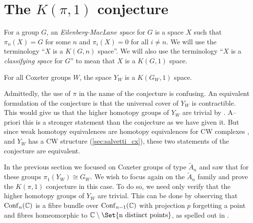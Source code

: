\documentclass[class=article, crop=false]{standalone}
\begin{document}
	
\section{The \texorpdfstring{$K(\pi,1)$}{K pi 1} conjecture}
For a group $G$, an \emph{Eilenberg-MacLane space} \cite{eilenberg_maclane_relations_1945} for $G$ is a space $X$ such that $\pi_n(X)=G$ for some $n$ and $\pi_i(X) = 0$ for all $i\neq n$. We will use the terminology ``$X$ is a $K(G,n)$ space''. We will also use the terminology ``$X$ is a \emph{classifying space} for $G$'' to mean that $X$ is a $K(G,1)$ space.
\begin{conjecture}[$K(\pi,1)$ Conjecture]
	For all Coxeter groups $W$, the space $Y_W$ is a $K(G_W,1)$ space.
\end{conjecture}

Admittedly, the use of $\pi$ in the name of the conjecture is confusing. An equivalent formulation of the conjecture is that the universal cover of $Y_W$ is contractible. This would give us that the higher homotopy groups of $Y_W$ are trivial by \cite[Porposition 4.1]{hatcher_algebraic_2001}. A--priori this is a stronger statement than the conjecture as we have given it. But since weak homotopy equivalences are homotopy equivalences for CW complexes \cite[Theorem 4.5]{hatcher_algebraic_2001}, and $Y_W$ has a CW structure (\cref{sec:salvetti_cx}), these two statements of the conjecture are equivalent.

In the previous section we focused on Coxeter groups of type $\tilde{A}_n$ and saw that for these groups $\pi_1(Y_W) \cong G_W$. We wish to focus again on the $\tilde{A}_n$ family and prove the $K(\pi, 1)$ conjecture in this case. To do so, we need only verify that the higher homotopy groups of $Y_W$ are trivial. This can be done by observing that $\operatorname{Conf}_n(\mathbb{C})$ is a fibre bundle over $\operatorname{Conf}_{n-1}(\mathbb{C})$ with projection $p$ forgetting a point and fibres homeomorphic to $\C \setminus \Set{\text{n distinct points}}$, as spelled out in \cite{sinha_homology_2010}.
\end{document}
